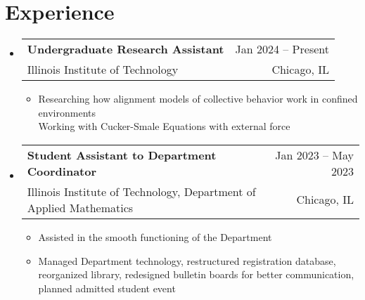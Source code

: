 \documentclass[letterpaper,10pt]{article}
\makeatletter
\newcommand{\resumeItem}[1]{
  \item\small{
    {#1 \vspace{-2pt}}
  }
}
\newcommand{\resumeSubheading}[4]{
    \item\vspace{-2pt}
    \begin{tabular*}{0.97\textwidth}[t]{l@{\extracolsep{\fill}}r}
      \textbf{#1} & #2 \\
      #3 & #4 \\
    \end{tabular*}\vspace{-7pt}
}
\newcommand{\resumeSubSubheading}[2]{
    \item
    \begin{tabular*}{0.97\textwidth}{l@{\extracolsep{\fill}}r}
      #1 & #2 \\
    \end{tabular*}\vspace{-7pt}
}
\newcommand{\resumeSubHeadingListStart}{\begin{itemize}[leftmargin=0.15in, label=]}
\newcommand{\resumeSubHeadingListEnd}{\end{itemize}}
\newcommand{\resumeItemListStart}{\begin{itemize}[label=]}
\newcommand{\resumeItemListEnd}{\end{itemize}\vspace{-5pt}}
\makeatother
\begin{document}
\section{Experience}
\resumeSubHeadingListStart
    \resumeSubheading{Undergraduate Research Assistant}{Jan 2024 -- Present}{Illinois Institute of Technology}{Chicago, IL}
        \resumeItemListStart
            \resumeItem{Researching how alignment models of collective behavior work in confined environments \\
            Working with Cucker-Smale Equations with external force}
        \resumeItemListEnd
    \resumeSubheading{Student Assistant to Department Coordinator}{Jan 2023 -- May 2023}{Illinois Institute of Technology, Department of Applied Mathematics}{Chicago, IL}
        \resumeItemListStart
            \resumeItem{Assisted in the smooth functioning of the Department}
            \resumeItem{Managed Department technology, restructured registration database, reorganized library, redesigned bulletin boards for better communication, planned admitted student event}
        \resumeItemListEnd


\resumeSubHeadingListEnd


\end{document}
